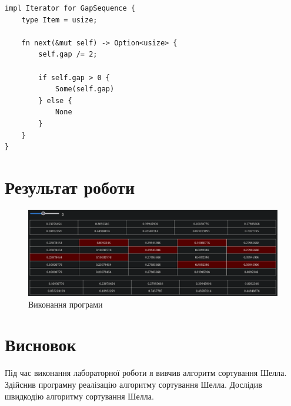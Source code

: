 \documentclass{article}
\begin{document}
\begin{normalsize}
\begin{lstlisting}
impl Iterator for GapSequence {
	type Item = usize;
	
	fn next(&mut self) -> Option<usize> {
		self.gap /= 2;
		
		if self.gap > 0 {
			Some(self.gap)
		} else {
			None
		}
	}
}\end{lstlisting}
		
		\section*{Результат роботи}
		\begin{figure}[H]
			\centering
			\includegraphics[scale=0.36]{1}
			\caption{Виконання програми}
		\end{figure}
		
		\section*{Висновок}
		Під час виконання лабораторної роботи я вивчив алгоритм сортування Шелла. Здійснив програмну реалізацію алгоритму сортування Шелла. Дослідив швидкодію алгоритму сортування Шелла.
		
	\end{normalsize}
\end{document}
